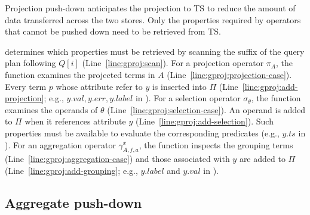 Projection push-down anticipates the projection to TS to reduce the amount of data transferred across the two stores.
Only the properties required by operators that cannot be pushed down need to be retrieved from TS.

 determines which properties must be retrieved by scanning the suffix of the query plan following $Q[i]$ (Line~\ref{line:gproj:scan}).
For a projection operator $\pi_A$, the function examines the projected terms in $A$ (Line~\ref{line:gproj:projection-case}).
Every term $p$ whose attribute refer to $y$ is inserted into $\Pi$ (Line~\ref{line:gproj:add-projection}; e.g., $y.val, y.err, y.label$ in ).
For a selection operator $\sigma_\theta$, the function examines the operands of $\theta$ (Line~\ref{line:gproj:selection-case}).
An operand is added to $\Pi$ when it references attribute $y$ (Line~\ref{line:gproj:add-selection}).
Such properties must be available to evaluate the corresponding predicates (e.g., $y.ts$ in ).
For an aggregation operator $\gamma^x_{A,f,a}$, the function inspects the grouping terms (Line~\ref{line:gproj:aggregation-case}) and those associated with $y$ are added to $\Pi$ (Line~\ref{line:gproj:add-grouping}; e.g., $y.label$ and $y.val$ in ).

\subsection{Aggregate push-down}
\label{subsec:aggregate-pushdown}


